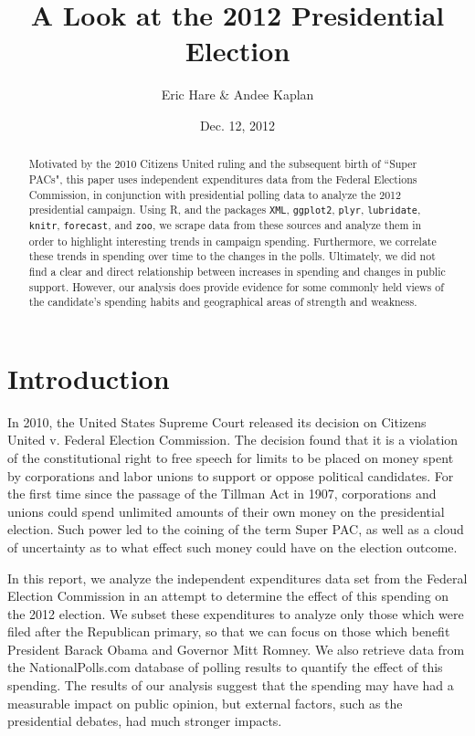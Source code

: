 \documentclass[11pt]{article}\usepackage{graphicx, color}
\begin{document}
\setlength{\parskip}{3ex}
\setlength{\parindent}{0pt}

\title{A Look at the 2012 Presidential Election}
\author{Eric Hare \& Andee Kaplan}
\date{Dec. 12, 2012}

\maketitle
\thispagestyle{empty}
\begin{abstract}
Motivated by the 2010 Citizens United ruling and the subsequent birth of ``Super PACs", this paper uses independent expenditures data from the Federal Elections Commission, in conjunction with presidential polling data to analyze the 2012 presidential campaign. Using R, and the packages \texttt{XML}, \texttt{ggplot2}, \texttt{plyr}, \texttt{lubridate}, \texttt{knitr}, \texttt{forecast}, and \texttt{zoo}, we scrape data from these sources and analyze them in order to highlight interesting trends in campaign spending. Furthermore, we correlate these trends in spending over time to the changes in the polls. Ultimately, we did not find a clear and direct relationship between increases in spending and changes in public support. However, our analysis does provide evidence for some commonly held views of the candidate's spending habits and geographical areas of strength and weakness.
\end{abstract}
\clearpage

\setcounter{page}{1}
\section{Introduction}
In 2010, the United States Supreme Court released its decision on Citizens United v. Federal Election Commission. The decision found that it is a violation of the constitutional right to free speech for limits to be placed on money spent by corporations and labor unions to support or oppose political candidates. For the first time since the passage of the Tillman Act in 1907, corporations and unions could spend unlimited amounts of their own money on the presidential election. Such power led to the coining of the term Super PAC, as well as a cloud of uncertainty as to what effect such money could have on the election outcome.

In this report, we analyze the independent expenditures data set from the Federal Election Commission in an attempt to determine the effect of this spending on the 2012 election.  We subset these expenditures to analyze only those which were filed after the Republican primary, so that we can focus on those which benefit President Barack Obama and Governor Mitt Romney. We also retrieve data from the NationalPolls.com database of polling results to quantify the effect of this spending. The results of our analysis suggest that the spending may have had a measurable impact on public opinion, but external factors, such as the presidential debates, had much stronger impacts.
\end{document}
